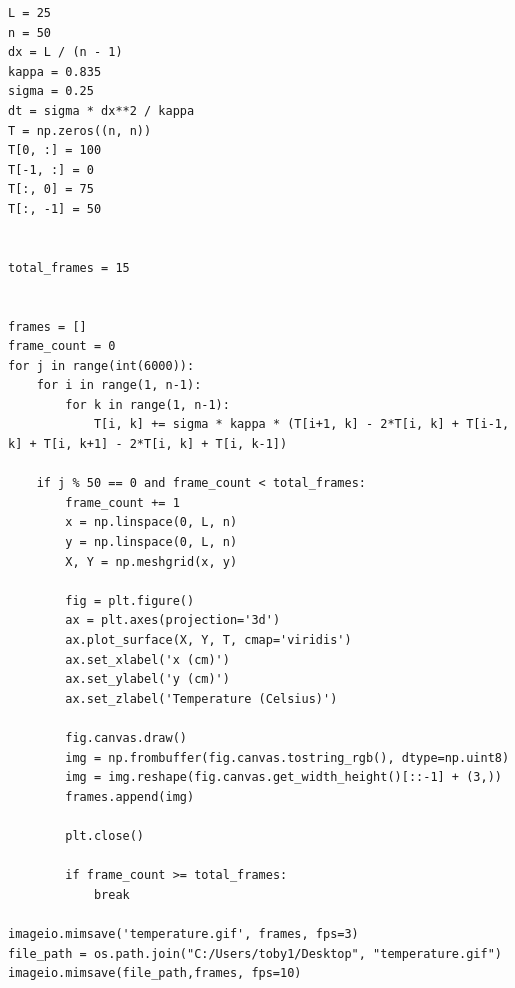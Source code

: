 \documentclass[12pt, a4paper, oneside]{ctexart}
\begin{document}
\begin{spacing}{2.0}
\begin{lstlisting}
L = 25 
n = 50 
dx = L / (n - 1) 
kappa = 0.835  
sigma = 0.25  
dt = sigma * dx**2 / kappa 
T = np.zeros((n, n))
T[0, :] = 100
T[-1, :] = 0 
T[:, 0] = 75
T[:, -1] = 50


total_frames = 15


frames = []
frame_count = 0
for j in range(int(6000)):
    for i in range(1, n-1):
        for k in range(1, n-1):
            T[i, k] += sigma * kappa * (T[i+1, k] - 2*T[i, k] + T[i-1, k] + T[i, k+1] - 2*T[i, k] + T[i, k-1])

    if j % 50 == 0 and frame_count < total_frames:
        frame_count += 1
        x = np.linspace(0, L, n)
        y = np.linspace(0, L, n)
        X, Y = np.meshgrid(x, y)

        fig = plt.figure()
        ax = plt.axes(projection='3d')
        ax.plot_surface(X, Y, T, cmap='viridis')
        ax.set_xlabel('x (cm)')
        ax.set_ylabel('y (cm)')
        ax.set_zlabel('Temperature (Celsius)')

        fig.canvas.draw()
        img = np.frombuffer(fig.canvas.tostring_rgb(), dtype=np.uint8)
        img = img.reshape(fig.canvas.get_width_height()[::-1] + (3,))
        frames.append(img)

        plt.close()

        if frame_count >= total_frames:
            break

imageio.mimsave('temperature.gif', frames, fps=3)
file_path = os.path.join("C:/Users/toby1/Desktop", "temperature.gif")
imageio.mimsave(file_path,frames, fps=10)





\end{lstlisting}



\end{spacing}{}
\end{document}
